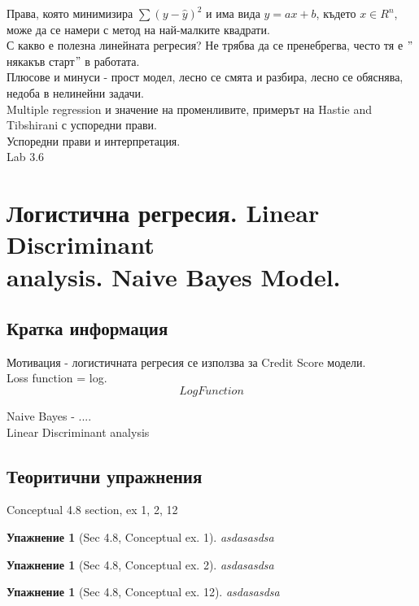 \documentclass{article}
\newtheorem{exercise}[subsubsection]{Упажнение}
\begin{document}
	Права, която минимизира $\sum (y-\hat{y})^2  $ и има вида $ y = ax + b$, където $x \in R^n $, може да се намери с метод на най-малките квадрати. \\
	С какво е полезна линейната регресия? Не трябва да се пренебрегва, често тя е $"$някакъв старт$"$ в работата. \\
	Плюсове и минуси - прост модел, лесно се смята и разбира, лесно се обяснява, недоба в нелинейни задачи. \\
	
	Multiple regression и значение на променливите, примерът на Hastie and Tibshirani с успоредни прави. \\
	Успоредни прави и интерпретация. \\
	Lab 3.6 

		
\newpage	
\section{Логистична регресия. Linear Discriminant \\ analysis. Naive Bayes Model.}




	\subsection{Кратка информация}
	Мотивация - логистичната регресия се използва за Credit Score модели.\\
	Loss function = log. \\
	$$Log Function $$
	
	Naive Bayes - .... \\
	Linear Discriminant analysis \\
	
	\subsection{Теоритични упражнения}
	Conceptual 4.8 section, ex 1, 2, 12 \\
	
	\begin{exercise}[Sec 4.8, Conceptual ex. 1]
		asdasasdsa
	\end{exercise}

	\begin{exercise}[Sec 4.8, Conceptual ex. 2]
		asdasasdsa
	\end{exercise}

	\begin{exercise}[Sec 4.8, Conceptual ex. 12]
		asdasasdsa
	\end{exercise}
\end{document}
